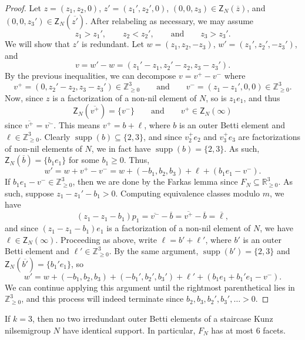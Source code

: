 \documentclass[ALCO, Unicode]{cedram}
\newcommand\ZZ{\mathbb{Z}}
\newcommand\RR{\mathbb{R}}
\DeclareMathOperator\supp{supp}
\begin{document}
\begin{proof}
Let $z = (z_1,z_2,0)$, $z' = (z_1',z_2',0)$, $(0,0,z_3) \in \mathsf{Z}_N(\overline{z})$, and $(0,0,z_3') \in \mathsf{Z}_N(\overline{z'})$.  
After relabeling as necessary, we may assume 
\[ 
z_1 > z_1',
\qquad
z_2< z_2',
\qquad \text{and} \qquad
z_3>z_3'.
\]
We will show that $z'$ is redundant. Let $w = (z_1,z_2,-z_3)$, $w' = (z_1',z_2',-z_3')$, and
\[
v = w' - w = (z_1' - z_1, z_2' - z_2, z_3 - z_3').
\]
By the previous inequalities, we can decompose $v = v^+ - v^-$ where
\[
v^+ = (0, z_2' - z_2, z_3 - z_3') \in \ZZ_{\ge 0}^3
\qquad \text{and} \qquad
v^- = (z_1 - z_1', 0, 0) \in \ZZ_{\ge 0}^3.
\]
Now, since $z$ is a factorization of a non-nil element of $N$, so is $z_1e_1$, and thus 
\[
\mathsf{Z}_N(\overline{v^+}) = \{v^-\}
\qquad \text{and} \qquad
v^+ \in \mathsf{Z}_N(\infty)
\]
since $\overline{v^+} = \overline{v^-}$.  
This means $v^+ = b + \ell$, where $b$ is an outer Betti element and $\ell \in \ZZ_{\geq 0}^3$.  Clearly $\supp(b) \subseteq \{2,3\}$, and since $v_2^+e_2$ and $v_3^+ e_3$ are factorizations of non-nil elements of $N$, we in fact have $\supp(b) = \{2,3\}$.  As such, $\mathsf{Z}_N(\overline{b}) = \{b_1e_1\}$ for some $b_1 \ge 0$.  Thus,
\[
w'
= w + v^+ - v^-
= w + (-b_1, b_2, b_3) + \ell + (b_1e_1 - v^-).
\]
If $b_1e_1 - v^- \in \ZZ_{\geq 0}^3$, then we are done by the Farkas lemma since $F_N \subseteq \RR_{\ge 0}^3$.  As such, suppose $z_1 - z_1' - b_1 > 0$.  Computing equivalence classes modulo $m$, we have 
\[
(z_1 - z_1 - b_1)p_1
= \overline{v^-} - \overline b
= \overline{v^+} - \overline b
= \overline \ell,
\]
and since $(z_1-z_1 - b_1)e_1$ is a factorization of a non-nil element of $N$, we have $\ell \in \mathsf{Z}_N(\infty)$.  Proceeding as above, write $\ell = b' + \ell'$, where $b'$ is an outer Betti element and $\ell' \in \ZZ_{\geq 0}^3$.  By the same argument, $\supp(b') = \{2,3\}$ and $\mathsf{Z}_N(\overline{b'}) = \{b_1'e_1\}$, so
\[
w' = w + (-b_1, b_2, b_3) + (-b_1', b_2', b_3') + \ell' + (b_1e_1 + b_1'e_1 - v^-).
\]
We can continue applying this argument until the rightmost parenthetical lies in $\ZZ_{\ge 0}^3$, and this process will indeed terminate since $b_2, b_3, b_2', b_3', \ldots > 0$.  
\end{proof}

\begin{coro}\label{c:facetbound}
If $k = 3$, then no two irredundant outer Betti elements of a staircase Kunz nilsemigroup $N$ have identical support.  In particular, $F_N$ has at most 6 facets.  
\end{coro}
\end{document}
